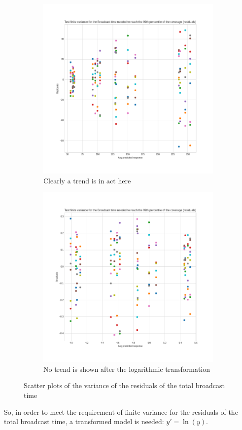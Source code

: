 \begin{figure}[!h]
	\centering
	\begin{subfigure}[b]{0.49\textwidth}
		\centering
		\includegraphics[width=\textwidth]{img/hd/broadcasttime-variance}
		\caption{Clearly a trend is in act
		here}\label{subfig:hdtimevariancebad}
	\end{subfigure}
	\begin{subfigure}[b]{0.49\textwidth}
		\centering
		\includegraphics[width=\textwidth]{img/hd/broadcasttime-variance-transform}
		\caption{No trend is shown after the logarithmic
		transformation}\label{subfig:hdtimevariancegood}
	\end{subfigure}
	\caption{Scatter plots of the variance of the residuals of the total
	broadcast time}\label{fig:hdtimevariance}
\end{figure}

So, in order to meet the requirement of finite variance for the residuals of the
total broadcast time, a transformed model is needed: \(y' = \ln(y)\).

